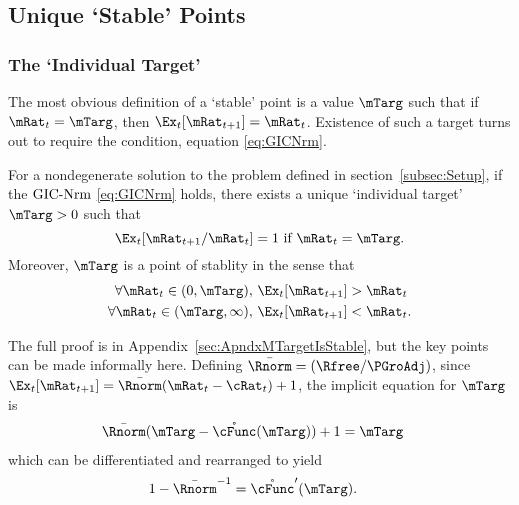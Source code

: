 \documentclass[BufferStockTheory]{subfiles}
\begin{document}
\subsection{Unique `Stable' Points}

\label{subsec:onetarget}
\hypertarget{TheoremTarget}{}


\subsubsection{The `Individual Target'} \label{subsubsec:mTarget}
The most obvious definition of a `stable' point is a value $\mTarg$ such that if $\mRat_{t}=\mTarg$, then $\Ex_{t}[\mRat_{t+1}]=\mRat_{t}$.  Existence of such a target turns out to require the {\GICNrm} condition, equation \eqref{eq:GICNrm}.

\begin{theorem}
  \label{thm:target} For a nondegenerate solution to the problem defined in section~\ref{subsec:Setup}, if the ${\mbox{GIC-Nrm}}$ \eqref{eq:GICNrm} holds, 
  there exists a unique `individual target' $\mTarg>0$ such that
  \begin{equation}  
    \Ex_t [{\mRat}_{t+1}/\mRat_t] = 1 \mbox{~if~} \mRat_t = \mTarg. 
    \label{eq:mTarget}
  \end{equation}
  Moreover, $\mTarg$ is a point of stablity in the sense that
  \begin{align}\label{eq:stability}
    \forall {\mRat}_t\in(0,\mTarg),      \,\,& \Ex_t [{\mRat}_{t+1}] > {\mRat}_t  \\
    \forall {\mRat}_t\in(\mTarg,\infty), \,\,& \Ex_t [{\mRat}_{t+1}] < {\mRat}_t. \notag
   \end{align}
 \end{theorem}

 \hypertarget{mTargImplicit}{}
 The full proof is in Appendix~\ref{sec:ApndxMTargetIsStable}, but the key points can be made informally here.  Defining $\bar{\Rnorm}=(\Rfree/\PGroAdj)$, since $\Ex_{t}[\mRat_{t+1}]=\bar{\Rnorm}(\mRat_{t}-\cRat_{t})+1$, the implicit equation for $\mTarg$ is 
 \begin{align}
   \bar{\Rnorm}(\mTarg-\mathring{\cFunc}(\mTarg))+1 & = \mTarg \label{eq:mTargImplicit}
 \end{align}
 which can be differentiated and rearranged to yield\hypertarget{mTargDerImplicit}{}
 \begin{align}
   1-\bar{\Rnorm}^{-1} & = \mathring{\cFunc}^{\prime}(\mTarg). \label{eq:mTargDerImplicit}
 \end{align}
\end{document}
